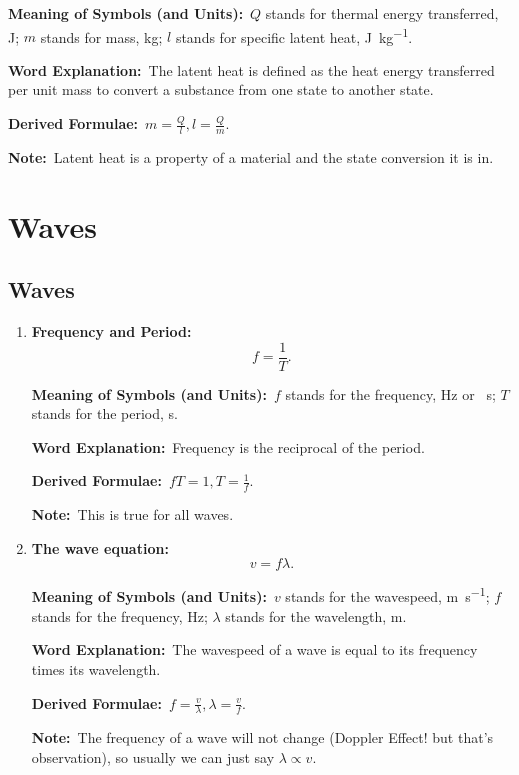 \documentclass[8pt]{article}
\newcommand{\MeanSymb}{\textbf{Meaning of Symbols (and Units):}\ }
\newcommand{\WordExpl}{\textbf{Word Explanation:}\ }
\newcommand{\DeriForm}{\textbf{Derived Formulae:}\ }
\newcommand{\Note}{\textbf{Note:}\ }
\begin{document}
\begin{enumerate}
                \MeanSymb \(Q\) stands for thermal energy transferred, \unit{\joule}; \(m\) stands for mass, \unit{\kilogram}; \(l\) stands for specific latent heat, \unit{\joule \per \kilogram}.

                \WordExpl The latent heat is defined as the heat energy transferred per unit mass to convert a substance from one state to another state.

                \DeriForm \(m = \frac{Q}{l}, l = \frac{Q}{m}\).

                \Note Latent heat is a property of a material and the state conversion it is in.
                
            \end{enumerate}

    \section{Waves}
        \subsection{Waves}
            \begin{enumerate}
                \item \textbf{Frequency and Period:}
                \[
                    f = \frac{1}{T}.
                \]

                \MeanSymb \(f\) stands for the frequency, \unit{\hertz} or \unit{\per \second}; \(T\) stands for the period, \unit{\second}.

                \WordExpl Frequency is the reciprocal of the period.

                \DeriForm \(fT = 1, T = \frac{1}{f}\).

                \Note This is true for all waves.

                \item \textbf{The wave equation:}
                \[
                    v = f \lambda.
                \]

                \MeanSymb \(v\) stands for the wavespeed, \unit{\metre \per \second}; \(f\) stands for the frequency, \unit{\hertz}; \(\lambda\) stands for the wavelength, \unit{\metre}.

                \WordExpl The wavespeed of a wave is equal to its frequency times its wavelength.

                \DeriForm \(f = \frac{v}{\lambda}, \lambda = \frac{v}{f}\).

                \Note The frequency of a wave will not change (Doppler Effect! but that's observation), so usually we can just say \(\lambda \propto v\).
            \end{enumerate}
\end{document}

